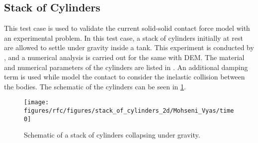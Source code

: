 


\FloatBarrier%
\subsection{Stack of Cylinders}
\label{sec:stack-of-cylinders}
This test case is used to validate the current solid-solid contact force model
with an experimental problem. In this test case, a stack of cylinders initially
at rest are allowed to settle under gravity inside a tank. This experiment is
conducted by \parencite{zhang_simulation_2009}, and a numerical analysis is carried
out for the same with DEM. The material and numerical parameters of the
cylinders are listed in . An additional damping
term is used while model the contact to consider the inelastic collision between
the bodies. The schematic of the cylinders can be seen in
\cref{fig:schematic:stack-of-cylinders}.
\begin{figure}[!htpb]
  \centering
  \texttt{[image: figures/rfc/figures/stack\_of\_cylinders\_2d/Mohseni\_Vyas/time0]}
  \caption{Schematic of a stack of cylinders collapsing under gravity.}
  \label{fig:schematic:stack-of-cylinders}
\end{figure}

